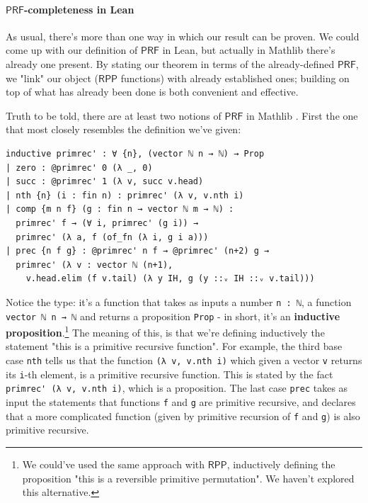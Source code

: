 \documentclass{book}
\theoremstyle{definition}
\theoremstyle{remark}
\theoremstyle{plain}
\newcommand{\RPP}{\mathsf{RPP}}
\newcommand{\PRF}{\mathsf{PRF}}
\begin{document}
\paragraph{$\PRF$-completeness in Lean}

As usual, there's more than one way in which our result can be proven.
We could come up with our definition of $\PRF$ in Lean,
but actually in Mathlib there's already one present.
By stating our theorem in terms of the already-defined $\PRF$,
we "link" our object ($\RPP$ functions) with already established ones;
building on top of what has already been done is both convenient and effective.

Truth to be told, there are at least two notions of $\PRF$ in Mathlib \cite{Carneiro19}.
First the one that most closely resembles the definition we've given:
\begin{lstlisting}
inductive primrec' : ∀ {n}, (vector ℕ n → ℕ) → Prop
| zero : @primrec' 0 (λ _, 0)
| succ : @primrec' 1 (λ v, succ v.head)
| nth {n} (i : fin n) : primrec' (λ v, v.nth i)
| comp {m n f} (g : fin n → vector ℕ m → ℕ) :
  primrec' f → (∀ i, primrec' (g i)) →
  primrec' (λ a, f (of_fn (λ i, g i a)))
| prec {n f g} : @primrec' n f → @primrec' (n+2) g →
  primrec' (λ v : vector ℕ (n+1),
    v.head.elim (f v.tail) (λ y IH, g (y ::ᵥ IH ::ᵥ v.tail)))
\end{lstlisting}
Notice the type: it's a function that takes as inputs a number \lstinline{n : ℕ},
a function \lstinline{vector ℕ n → ℕ} and returns a proposition \lstinline{Prop} -
in short, it's an \textbf{inductive proposition}.\footnote{We could've used the same approach with $\RPP$, inductively defining the proposition
"this is a reversible primitive permutation". We haven't explored this alternative.}
The meaning of this, is that we're defining inductively the statement "this is a primitive recursive function".
For example, the third base case \lstinline{nth} tells us that the function \lstinline{(λ v, v.nth i)}
which given a vector \lstinline{v} returns its \lstinline{i}-th element, is a primitive recursive function.
This is stated by the fact \lstinline{primrec' (λ v, v.nth i)}, which is a proposition.
The last case \lstinline{prec} takes as input the statements that functions \lstinline{f} and \lstinline{g} are primitive recursive,
and declares that a more complicated function (given by primitive recursion of \lstinline{f} and \lstinline{g}) is also primitive recursive.
\end{document}

